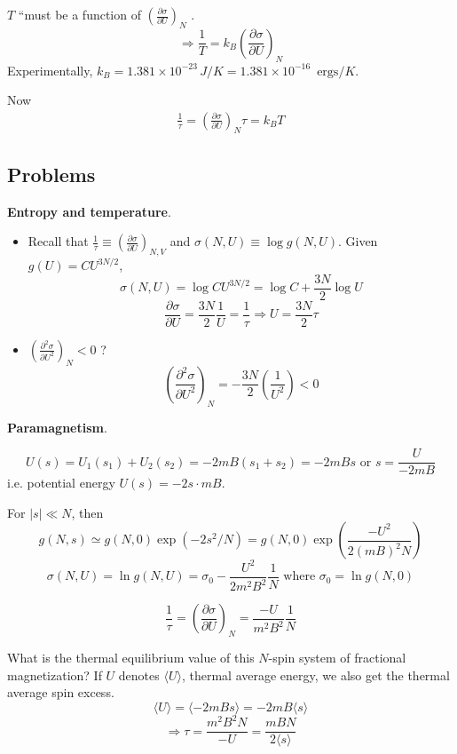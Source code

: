 $T$ ``must be a function of $ \left( \frac{ \partial \sigma}{ \partial U} \right)_N$ \cite{CKittelHKroemer1980}.  
\[
\Longrightarrow \frac{1}{T} = k_B \left( \frac{ \partial \sigma }{ \partial U} \right)_N
\]
Experimentally, $k_B = 1.381 \times 10^{-23} \, J/K = 1.381\times 10^{-16} \, \text{ ergs}/ K$.  

Now 
\[
\begin{gathered}
\frac{1}{\tau} = \left( \frac{ \partial \sigma }{ \partial U} \right)_N
\tau = k_B T
\end{gathered}
\]


\subsection*{Problems}

 \textbf{Entropy and temperature}.  
\begin{itemize}
\item[(a)] Recall that $\frac{1}{\tau} \equiv \left( \frac{ \partial \sigma }{ \partial U} \right)_{N,V}$ and $\sigma(N,U) \equiv \log{ g(N,U)}$.  Given $g(U) = CU^{3N/2}$, 
\[
\sigma(N,U) = \log{ CU^{3N/2}} = \log{C} + \frac{3N}{2} \log{U}
\]
\[
\frac{ \partial \sigma}{ \partial U} = \frac{ 3N }{2} \frac{1}{U} = \frac{1}{ \tau} \Longrightarrow \boxed{ U = \frac{ 3N}{2} \tau  }
\]
\item[(b)] $\left( \frac{ \partial^2 \sigma}{ \partial U^2 } \right)_N < 0$ ?
\[
\left( \frac{ \partial^2 \sigma}{ \partial U^2} \right)_N = - \frac{3 N}{2} \left( \frac{1}{U^2} \right) < 0 
\]
\end{itemize}

 \textbf{Paramagnetism}.    

\[
U(s) = U_1(s_1) + U_2(s_2) = -2m B(s_1 + s_2) = -2mBs \text{ or } s = \frac{ U }{ -2 mB }
\]
i.e. potential energy $U(s) = -2s\cdot mB$.  

For $|s| \ll N$, then 
\[
g(N,s) \simeq g(N,0) \exp{ \left( -2s^2 /N \right) } = g(N,0) \exp{ \left( \frac{ - U^2 }{ 2 (mB)^2 N } \right) }
\]
\[
\sigma(N,U) = \ln{ g(N,U) } = \sigma_0 - \frac{ U^2 }{ 2m^2 B^2 } \frac{1}{N} \text{ where } \sigma_0 = \ln{ g(N,0) }
\]

\[
\frac{1}{\tau} = \left( \frac{ \partial \sigma }{ \partial U } \right)_N = \frac{ - U}{ m^2 B^2 } \frac{1}{N}
\]

What is the thermal equilibrium value of this $N$-spin system of fractional magnetization?  If $U$ denotes $\langle U \rangle$, thermal average energy, we also get the thermal average spin excess.  
\[
\langle U \rangle = \langle - 2 mB s \rangle = - 2mB \langle s \rangle
\]
\[
\Longrightarrow \tau = \frac{ m^2 B^2 N }{-U} = \boxed{ \frac{ m B N }{ 2 \langle s \rangle } }
\]


